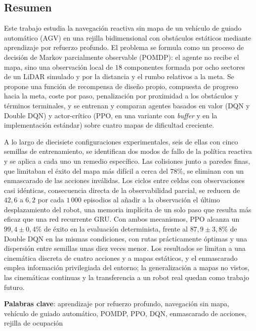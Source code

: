 \noindent \begin{center}
\section*{Resumen}
\par\end{center}

Este trabajo estudia la navegación reactiva sin mapa de un vehículo de
guiado automático (AGV) en una rejilla bidimensional con obstáculos
estáticos mediante aprendizaje por refuerzo profundo. El problema se
formula como un proceso de decisión de Markov parcialmente observable
(POMDP): el agente no recibe el mapa, sino una observación local de
$18$ componentes formada por ocho sectores de un LiDAR simulado y por la
distancia y el rumbo relativos a la meta. Se propone una función de
recompensa de diseño propio, compuesta de progreso hacia la meta, coste
por paso, penalización por proximidad a los obstáculos y términos terminales, y se
entrenan y comparan agentes basados en valor (DQN y Double DQN) y
actor-crítico (PPO, en una variante con \textit{buffer} y en la
implementación estándar) sobre cuatro mapas de dificultad creciente.

A lo largo de diecisiete configuraciones experimentales, seis de ellas
con cinco semillas de entrenamiento, se identifican dos modos de fallo
de la política reactiva y se aplica a cada uno un remedio específico.
Las colisiones junto a paredes finas, que limitaban el éxito del mapa más
difícil a cerca del $78\%$, se eliminan con un enmascarado de las
acciones inválidas. Los ciclos entre celdas con observaciones casi
idénticas, consecuencia directa de la observabilidad parcial, se reducen
de $42{,}6$ a $6{,}2$ por cada $1\,000$ episodios al añadir a la
observación el último desplazamiento del robot, una memoria implícita de
un solo paso que resulta más eficaz que una red recurrente GRU. Con
ambos mecanismos, PPO alcanza un $99{,}4 \pm 0{,}4\%$ de éxito en la
evaluación determinista, frente al $87{,}9 \pm 3{,}8\%$ de Double DQN en
las mismas condiciones, con rutas prácticamente óptimas y una
dispersión entre semillas unas diez veces menor. Los resultados se
limitan a una cinemática discreta de cuatro acciones y a mapas
estáticos, y el enmascarado emplea información privilegiada del
entorno; la generalización a mapas no vistos, las cinemáticas
continuas y la transferencia a un robot real quedan como trabajo futuro.

\vspace{0.5cm}
\begin{flushleft}
\textbf{Palabras clave}: aprendizaje por refuerzo profundo, navegación
sin mapa, vehículo de guiado automático, POMDP, PPO, DQN, enmascarado de
acciones, rejilla de ocupación
\end{flushleft}

